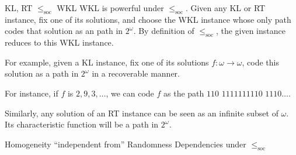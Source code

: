 \begin{frame}{KL, RT $\leq_{\text{soc}}$ WKL}
  WKL is powerful under $\leq_{\text{soc}}$. Given any KL or RT
  instance, fix one of its solutions, and choose the WKL instance whose only
  path codes that solution as an path in $2^\omega$. By definition of
  $\leq_{\text{soc}}$, the given instance reduces to this WKL instance.

  \vspace{1em}
  For example, given a KL instance, fix one of its solutions
  $f:\omega\rightarrow\omega$, code this solution as a path in $2^\omega$
  in a recoverable manner.

  \vspace{1em}
  For instance, if $f$ is $2,9,3,\ldots$, we can code $f$ as the path
  $110$ $1111111110$ $1110\ldots$.

  \vspace{1em}
  Similarly, any solution of an RT instance can be seen as an infinite
  subset of $\omega$. Its characteristic function will be a path in
  $2^\omega$.
\end{frame}

\begin{frame}{Homogeneity ``independent from'' Randomness}
  Dependencies under $\leq_{\text{soc}}$
  \vspace{2em}

  \begin{center}
  \end{center}
\end{frame}
